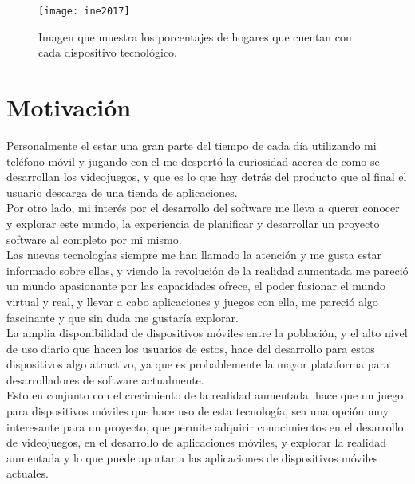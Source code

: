 \begin{figure}[h]
  \centering
  \texttt{[image: ine2017]}
  \caption{Imagen que muestra los porcentajes de hogares que cuentan con cada dispositivo tecnológico.\protect\footnotemark}
  \label{figura-ine}
\end{figure}


\newpage

\section{Motivación}
Personalmente el estar una gran parte del tiempo de cada día utilizando mi teléfono móvil y jugando con el me despertó la curiosidad acerca de como se desarrollan los videojuegos, y que es lo que hay detrás del producto que al final el usuario descarga de una tienda de aplicaciones.\\

Por otro lado, mi interés por el desarrollo del software me lleva a querer conocer y explorar este mundo, la experiencia de planificar y desarrollar un proyecto software al completo por mi mismo.\\

Las nuevas tecnologías siempre me han llamado la atención y me gusta estar informado sobre ellas, y viendo la revolución de la realidad aumentada me pareció un mundo apasionante por las capacidades ofrece, el poder fusionar el mundo virtual y real, y llevar a cabo aplicaciones y juegos con ella, me pareció algo fascinante y que sin duda me gustaría explorar.\\

La amplia disponibilidad de dispositivos móviles entre la población, y el alto nivel de uso diario que hacen los usuarios de estos, hace del desarrollo para estos dispositivos algo atractivo, ya que es probablemente la mayor plataforma para desarrolladores de software actualmente.\\

Esto en conjunto con el crecimiento de la realidad aumentada, hace que un juego para dispositivos móviles que hace uso de esta tecnología, sea una opción muy interesante para un proyecto, que permite adquirir conocimientos en el desarrollo de videojuegos, en el desarrollo de aplicaciones móviles, y explorar la realidad aumentada y lo que puede aportar a las aplicaciones de dispositivos móviles actuales.

